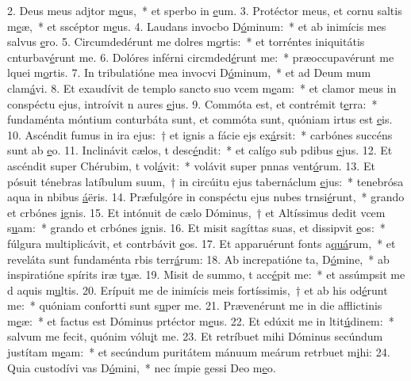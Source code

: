 2. Deus meus adjtor m\uline{e}us,~* et sperbo in \uline{e}um.
3. Protéctor meus, et cornu saltis m\uline{e}æ,~* et sscéptor m\uline{e}us.
4. Laudans invocbo D\uline{ó}minum:~* et ab inimícis mes salvus \uline{e}ro.
5. Circumdedérunt me dolres m\uline{o}rtis:~* et torréntes iniquitátis cnturbav\uline{é}runt me.
6. Dolóres inférni circmded\uline{é}runt me:~* præoccupavérunt me lquei m\uline{o}rtis.
7. In tribulatióne mea invocvi D\uline{ó}minum,~* et ad Deum mum clam\uline{á}vi.
8. Et exaudívit de templo sancto suo vcem m\uline{e}am:~* et clamor meus in conspéctu ejus, introívit n aures \uline{e}jus.
9. Commóta est, et contrémit t\uline{e}rra:~* fundaménta móntium conturbáta sunt, et commóta sunt, quóniam irtus est \uline{e}is.
10. Ascéndit fumus in ira ejus:~† et ignis a fácie ejs ex\uline{á}rsit:~* carbónes succéns sunt ab \uline{e}o.
11. Inclinávit cælos, t desc\uline{é}ndit:~* et calígo sub pdibus \uline{e}jus.
12. Et ascéndit super Chérubim, t vol\uline{á}vit:~* volávit super pnnas vent\uline{ó}rum.
13. Et pósuit ténebras latíbulum suum,~† in circúitu ejus tabernáclum \uline{e}jus:~* tenebrósa aqua in nbibus \uline{á}ëris.
14. Præfulgóre in conspéctu ejus nubes trnsi\uline{é}runt,~* grando et crbónes \uline{i}gnis.
15. Et intónuit de cælo Dóminus,~† et Altíssimus dedit vcem s\uline{u}am:~* grando et crbónes \uline{i}gnis.
16. Et misit sagíttas suas, et dissipvit \uline{e}os:~* fúlgura multiplicávit, et contrbávit \uline{e}os.
17. Et apparuérunt fonts a\uline{quá}rum,~* et reveláta sunt fundaménta rbis terr\uline{á}rum:
18. Ab increpatióne ta, D\uline{ó}mine,~* ab inspiratióne spírits iræ t\uline{u}æ.
19. Misit de summo, t acc\uline{é}pit me:~* et assúmpsit me d aquis m\uline{u}ltis.
20. Erípuit me de inimícis meis fortíssimis,~† et ab his  od\uline{é}runt me:~* quóniam confortti sunt s\uline{u}per me.
21. Prævenérunt me in die afflictinis m\uline{e}æ:~* et factus est Dóminus prtéctor m\uline{e}us.
22. Et edúxit me in ltit\uline{ú}dinem:~* salvum me fecit, quónim vólu\uline{i}t me.
23. Et retríbuet mihi Dóminus secúndum justítam m\uline{e}am:~* et secúndum puritátem mánuum meárum retrbuet m\uline{i}hi:
24. Quia custodívi vas D\uline{ó}mini,~* nec ímpie gessi  Deo m\uline{e}o.

